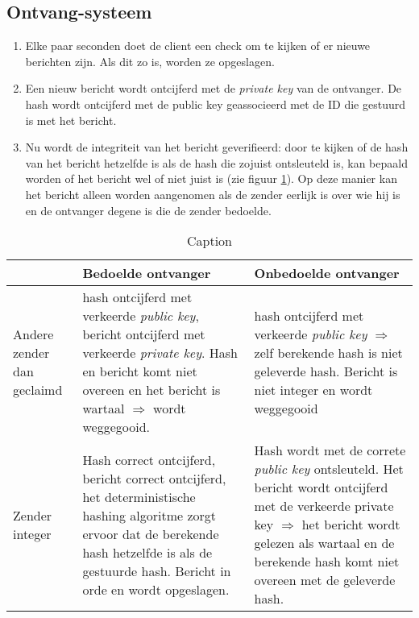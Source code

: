 \documentclass{report} %
\begin{document}
\subsection{Ontvang-systeem}
\begin{enumerate}
    \item Elke paar seconden doet de client een check om te kijken of er nieuwe berichten zijn. Als dit zo is, worden ze opgeslagen.
    \item Een nieuw bericht wordt ontcijferd met de \textit{private key} van de ontvanger. De hash wordt ontcijferd met de public key geassocieerd met de ID die gestuurd is met het bericht.
    \item Nu wordt de integriteit van het bericht geverifieerd: door te kijken of de hash van het bericht hetzelfde is als de hash die zojuist ontsleuteld is, kan bepaald worden of het bericht wel of niet juist is (zie figuur \ref{tab:send_receive_truthtable}). Op deze manier kan het bericht alleen worden aangenomen als de zender eerlijk is over wie hij is en de ontvanger degene is die de zender bedoelde.
\end{enumerate}

\begin{table}[htp]
    \centering
    \begin{tabular}{p{3cm}|p{5cm}|p{5cm}}
                        & Bedoelde ontvanger & Onbedoelde ontvanger \\ \hline
         Andere zender dan geclaimd & hash ontcijferd met verkeerde \textit{public key}, bericht ontcijferd met verkeerde \textit{private key}. Hash en bericht komt niet overeen en het bericht is wartaal $\Rightarrow$ wordt weggegooid. & hash ontcijferd met verkeerde \textit{public key} $\Rightarrow$ zelf berekende hash is niet geleverde hash. Bericht is niet integer en wordt weggegooid \\ \hline
         Zender integer & Hash correct ontcijferd, bericht correct ontcijferd, het deterministische hashing algoritme zorgt ervoor dat de berekende hash hetzelfde is als de gestuurde hash. Bericht in orde en wordt opgeslagen. & Hash wordt met de correte \textit{public key} ontsleuteld. Het bericht wordt ontcijferd met de verkeerde private key $\Rightarrow$ het bericht wordt gelezen als wartaal en de berekende hash komt niet overeen met de geleverde hash.\\
    \end{tabular}
    \caption{Caption}
    \label{tab:send_receive_truthtable}
\end{table}
\end{document}
